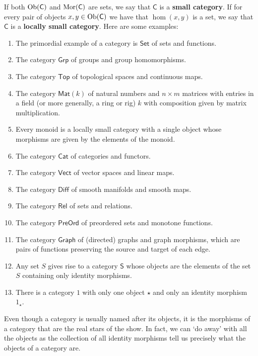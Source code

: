 \documentclass[oneside,final]{ucr}
\theoremstyle{definition}
\newcommand{\define}[1]{{\bf \boldmath #1}}
\begin{document}
{If both $\textnormal{Ob}(\mathsf{C})$ and $\textnormal{Mor}(\mathsf{C})$ are sets, we say that $\mathsf{C}$ is a \define{small category}. If for every pair of objects $x,y \in \textnormal{Ob}(\mathsf{C})$ we have that $\hom(x,y)$ is a set, we say that $\mathsf{C}$ is a \define{locally small category}. Here are some examples:
\begin{enumerate}
\item{The primordial example of a category is $\mathsf{Set}$ of sets and functions.}
\item{The category $\mathsf{Grp}$ of groups and group homomorphisms.}
\item{The category $\mathsf{Top}$ of topological spaces and continuous maps.}
\item{The category $\mathsf{Mat}(k)$ of natural numbers and $n \times m$ matrices with entries in a field (or more generally, a ring or rig) $k$ with composition given by matrix multiplication.}
\item{Every monoid is a locally small category with a single object whose morphisms are given by the elements of the monoid.}
\item{The category $\mathsf{Cat}$ of categories and functors.}
\item{The category $\mathsf{Vect}$ of vector spaces and linear maps.}
\item{The category $\mathsf{Diff}$ of smooth manifolds and smooth maps.}
\item{The category $\mathsf{Rel}$ of sets and relations.}
\item{The category $\mathsf{PreOrd}$ of preordered sets and monotone functions.}
\item{The category $\mathsf{Graph}$ of (directed) graphs and graph morphisms, which are pairs of functions preserving the source and target of each edge.}
\item{Any set $S$ gives rise to a category $\mathsf{S}$ whose objects are the elements of the set $S$ containing only identity morphisms.}
\item{There is a category $1$ with only one object $\star$ and only an identity morphism $1_\star$.}
\end{enumerate}

Even though a category is usually named after its objects, it is the morphisms of a category that are the real stars of the show. In fact, we can `do away' with all the objects as the collection of all identity morphisms tell us precisely what the objects of a category are.

}
\end{document}
